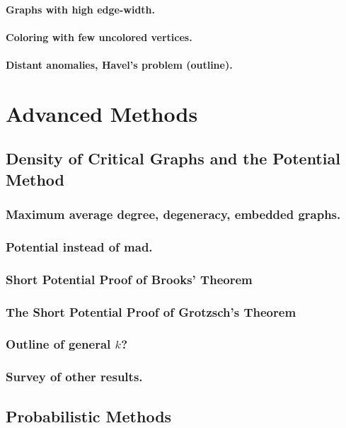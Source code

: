 \documentclass[12pt,twoside,openright,a4paper]{book}
\begin{document}
\subsection{Graphs with high edge-width.}
\subsection{Coloring with few uncolored vertices.}
\subsection{Distant anomalies, Havel's problem (outline).}

\part{Advanced Methods}

\chapter{Density of Critical Graphs and the Potential Method}\label{chap:potential}


\section{Maximum average degree, degeneracy, embedded graphs.}
\section{Potential instead of mad.}
\section{Short Potential Proof of Brooks' Theorem}
\section{The Short Potential Proof of Grotzsch's Theorem}
\section{Outline of general $k$?}
\section{Survey of other results.}

\chapter{Probabilistic Methods}
\end{document}

